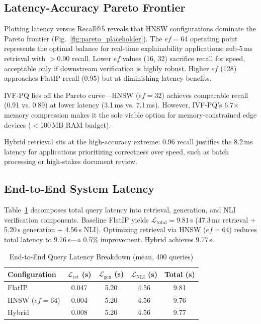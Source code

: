 \documentclass[conference]{IEEEtran}
\begin{document}
\subsection{Latency-Accuracy Pareto Frontier}

Plotting latency versus Recall@5 reveals that HNSW configurations dominate the Pareto frontier (Fig.~\ref{fig:pareto_placeholder}). The $ef{=}64$ operating point represents the optimal balance for real-time explainability applications: sub-5\,ms retrieval with $>$0.90 recall. Lower $ef$ values (16, 32) sacrifice recall for speed, acceptable only if downstream verification is highly robust. Higher $ef$ (128) approaches FlatIP recall (0.95) but at diminishing latency benefits.

IVF-PQ lies off the Pareto curve—HNSW ($ef{=}32$) achieves comparable recall (0.91 vs. 0.89) at lower latency (3.1\,ms vs. 7.1\,ms). However, IVF-PQ's 6.7$\times$ memory compression makes it the sole viable option for memory-constrained edge devices ($<$100\,MB RAM budget).

Hybrid retrieval sits at the high-accuracy extreme: 0.96 recall justifies the 8.2\,ms latency for applications prioritizing correctness over speed, such as batch processing or high-stakes document review.

\subsection{End-to-End System Latency}

Table~\ref{tab:e2e} decomposes total query latency into retrieval, generation, and NLI verification components. Baseline FlatIP yields $\mathcal{L}_{\mathrm{total}}{=}9.81$\,s (47.3\,ms retrieval + 5.20\,s generation + 4.56\,s NLI). Optimizing retrieval via HNSW ($ef{=}64$) reduces total latency to 9.76\,s—a 0.5\% improvement. Hybrid achieves 9.77\,s.

\begin{table}[t]
\caption{End-to-End Query Latency Breakdown (mean, 400 queries)}
\label{tab:e2e}
\centering
\small
\begin{tabular}{@{}lcccc@{}}
\toprule
Configuration & $\mathcal{L}_{\mathrm{ret}}$ (s) & $\mathcal{L}_{\mathrm{gen}}$ (s) & $\mathcal{L}_{\mathrm{NLI}}$ (s) & Total (s) \\
\midrule
FlatIP & 0.047 & 5.20 & 4.56 & 9.81 \\
HNSW ($ef{=}64$) & 0.004 & 5.20 & 4.56 & 9.76 \\
Hybrid & 0.008 & 5.20 & 4.56 & 9.77 \\
\bottomrule
\end{tabular}
\end{table}
\end{document}
